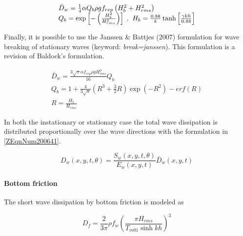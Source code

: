 \documentclass{article}
\begin{document}
\noindent 
\begin{equation} \label{ZEqnNum650667} 
\begin{array}{l} {\bar{D}_{w} =\frac{1}{4} \alpha Q_{b} \rho gf_{rep} \left(H_{b}^{2} +H_{rms}^{2} \right)} \\ {Q_{b} =\exp \left[-\left(\frac{H_{b}^{2} }{H_{rms}^{2} } \right)\right]{\rm \; ,\; \; }H_{b} =\frac{0.88}{k} \tanh \left[\frac{\gamma kh}{0.88} \right]} \end{array} 
\end{equation} 


\noindent Finally, it is possible to use the Janssen \& Battjes (2007) formulation for wave breaking of stationary waves (keyword: \textit{break=janssen}). This formulation is a revision of Baldock's formulation. 

\noindent 

 
\begin{equation} \label{2.15)} 
\begin{array}{l} {\bar{D}_{w} =\frac{3\sqrt{\pi } \alpha f_{rep} \rho gH_{rms}^{3} }{16} Q_{b} } \\ {Q_{b} =1+\frac{4}{3\sqrt{\pi } } \left(R^{3} +\frac{3}{2} R\right)\exp \left(-R^{2} \right)-erf\left(R\right)} \\ {R=\frac{H_{b} }{H_{rms} } } \end{array} 
\end{equation} 

 

\noindent In both the instationary or stationary case the total wave dissipation is distributed proportionally over the wave directions with the formulation in \eqref{ZEqnNum200641}.

\noindent 
\begin{equation} \label{ZEqnNum200641} 
D_{w} (x,y,t,\theta )=\frac{S_{w} (x,y,t,\theta )}{E_{w} (x,y,t)} \bar{D}_{w} (x,y,t) 
\end{equation} 


\paragraph{ Bottom friction}

\noindent The short wave dissipation by bottom friction is modeled as

\noindent 
\begin{equation} \label{ZEqnNum711028} 
D_{f} =\frac{2}{3\pi } \rho f_{w} \left(\frac{\pi H_{rms} }{T_{m01} \sinh kh} \right)^{3}  
\end{equation} 
\end{document}
